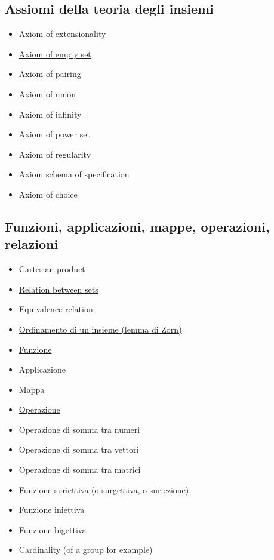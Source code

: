 \subsection*{Assiomi della teoria degli insiemi}
\begin{itemize}
 \item \href{./Extensionality.pdf}{Axiom of extensionality}
 \item \href{./EmptySet.pdf}{Axiom of empty set}
 \item Axiom of pairing
 \item Axiom of union
 \item Axiom of infinity
 \item Axiom of power set
 \item Axiom of regularity
 \item Axiom schema of specification
 \item Axiom of choice
\end{itemize}

\subsection*{Funzioni, applicazioni, mappe, operazioni, relazioni}
\begin{itemize}
 \item \href{CartesianProduct.pdf}{Cartesian product}
 \item \href{Relation.pdf}{Relation between sets}
 \item \href{EquivalenceRelation.pdf}{Equivalence relation}
 \item \href{OrdinamentoInsieme.pdf}{Ordinamento di un insieme (lemma di Zorn)}
 \item \href{Function.pdf}{Funzione}
 \item Applicazione
 \item Mappa
 \item \href{Operazione.pdf}{Operazione}
 \item Operazione di somma tra numeri
 \item Operazione di somma tra vettori
 \item Operazione di somma tra matrici
 \item \href{./FunzioneSuriettiva.pdf}{Funzione suriettiva (o surgettiva, o suriezione)}
 \item Funzione iniettiva
 \item Funzione bigettiva
 \item Cardinality (of a group for example)
\end{itemize}

